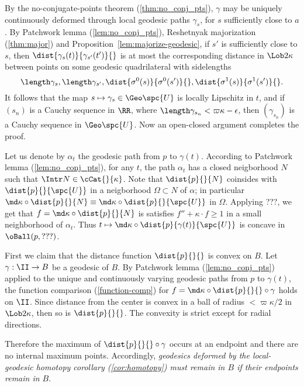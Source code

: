 By the no-conjugate-points theorem (\ref{thm:no_conj_pts}), $\gamma$ may be uniquely continuously deformed through local geodesic paths $\gamma_s$, for $s$ sufficiently close to $a$. By Patchwork lemma (\ref{lem:no_conj_pts}), Reshetnyak majorization (\ref{thm:major}) and Proposition~\ref{lem:majorize-geodesic}, if $s'$ is sufficiently close to $s$, then $\dist{\gamma_s(t)}{\gamma_{s'}(t')}{}$ is at most the corresponding distance in $\Lob2{\kappa}$ between points on some geodesic quadrilateral with sidelengths 
$$\length\gamma_s, \length\gamma_{s'}, \dist{\sigma^0(s)}{\sigma^0(s')}{}, \dist{\sigma^1(s)}{\sigma^1(s')}{}.$$  
It follows that the map $s\mapsto\gamma_s\in\Geo \spc{U}$ is locally Lipschitz in $t$, and if $(s_n)$ is a  Cauchy sequence in $\RR$, where $\length\gamma_{s_n}< \varpi\kappa-\epsilon$, then $(\gamma_{s_n})$ is a Cauchy sequence in $\Geo \spc{U}$. Now  an open-closed argument completes the proof. 
\qeds





Let us denote by $\alpha_t$ the geodesic path from $p$ to $\gamma(t)$.
According to Patchwork lemma (\ref{lem:no_conj_pts}), for any $t$, the path $\alpha_t$ has a closed neigborhood $N$ such that $\Intr N\in \cCat{}{\kappa}$.
Note that $\dist{p}{}{N}$ coinsides with $\dist{p}{}{\spc{U}}$ in a neigborhood $\Omega\subset N$ of $\alpha$;
in particular $\md\kappa\circ\dist{p}{}{N}\equiv \md\kappa\circ\dist{p}{}{\spc{U}}$ in $\Omega$.
Applying ???, we get that $f=\md\kappa\circ\dist{p}{}{N}$ is satisfies $f''+\kappa\cdot f\ge 1$ in a small neighborhood of $\alpha_t$.
Thus $t\mapsto\md\kappa\circ\dist{p}{\gamma(t)}{\spc{U}}$ is concave in $\oBall(p,???)$.




First we claim that the distance function $\dist{p}{}{}$ is convex on $B$. 
Let $\gamma:\II\to B $ be a geodesic of $B$.  
By Patchwork lemma  (\ref{lem:no_conj_pts}) applied to the unique and continuously varying geodesic paths from $p$ to $\gamma(t)$, 
the function comparison (\ref{function-comp}) for $f=\md\kappa\circ \dist{p}{}{}\circ \gamma$ holds on $\II$. Since distance from the center is convex in a ball of radius $<\varpi\kappa/2$ in $\Lob2\kappa$, then so is $\dist{p}{}{}$.  The convexity is strict except for radial directions.  

Therefore the maximum of $\dist{p}{}{}\circ \gamma$ occurs at an endpoint and there are no internal maximum points. Accordingly, \emph{geodesics deformed by the local-geodesic homotopy corollary (\ref{cor:homotopy}) 
must remain in $B$ if their endpoints remain in  $B$}.

